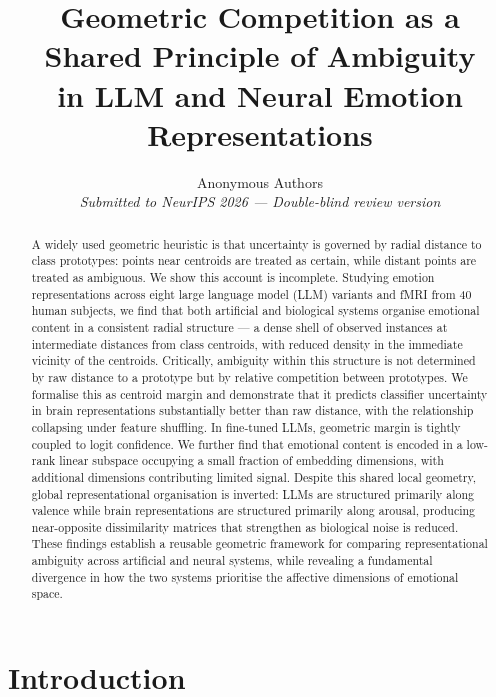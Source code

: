 \documentclass{article}
\title{Geometric Competition as a Shared Principle of Ambiguity\\
       in LLM and Neural Emotion Representations}
\author{
  Anonymous Authors \\
  \textit{Submitted to NeurIPS 2026 --- Double-blind review version}
}
\begin{document}
\maketitle

\begin{abstract}
A widely used geometric heuristic is that uncertainty is governed by radial distance to
class prototypes: points near centroids are treated as certain, while distant points are
treated as ambiguous.
We show this account is incomplete.
Studying emotion representations across eight large language model (LLM) variants and
fMRI from 40 human subjects, we find that both artificial and biological systems organise
emotional content in a consistent radial structure --- a dense shell of observed instances
at intermediate distances from class centroids, with reduced density in the immediate
vicinity of the centroids.
Critically, ambiguity within this structure is not determined by raw distance to a prototype
but by relative competition between prototypes.
We formalise this as centroid margin and demonstrate that it predicts classifier uncertainty
in brain representations substantially better than raw distance, with the relationship
collapsing under feature shuffling.
In fine-tuned LLMs, geometric margin is tightly coupled to logit confidence.
We further find that emotional content is encoded in a low-rank linear subspace occupying
a small fraction of embedding dimensions, with additional dimensions contributing limited
signal.
Despite this shared local geometry, global representational organisation is inverted:
LLMs are structured primarily along valence while brain representations are structured
primarily along arousal, producing near-opposite dissimilarity matrices that strengthen
as biological noise is reduced.
These findings establish a reusable geometric framework for comparing representational
ambiguity across artificial and neural systems, while revealing a fundamental divergence
in how the two systems prioritise the affective dimensions of emotional space.
\end{abstract}

\section{Introduction}
\end{document}
